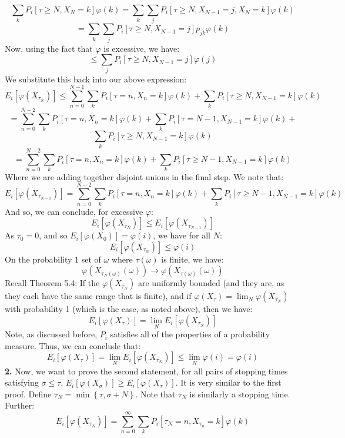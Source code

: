 \documentclass[12pt,a4paper]{article}
\newcommand{\1}[1]{\mathbbm{1}\left\{ #1 \right\}}
\begin{document}
$$
	\sum_k P_i\left[\tau \geq N, X_N = k\right]\varphi(k) =
	\sum_k \sum_j P_i\left[\tau \geq N, X_{N-1} = j, X_N = k\right]\varphi(k)
$$
$$
	= \sum_k \sum_j P_i\left[\tau \geq N, X_{N-1} = j\right]p_{jk}\varphi(k)
$$
Now, using the fact that $\varphi$ is excessive, we have:
$$
	\leq \sum_j P_i\left[\tau \geq N, X_{N-1} = j\right]\varphi(j)
$$
We substitute this back into our above expression:
$$
	E_i\left[\varphi(X_{\tau_N})\right] \leq
	\sum_{n=0}^{N-1} \sum_k P_i\left[\tau = n, X_n = k\right]\varphi(k) +
	\sum_k P_i\left[\tau \geq N, X_{N-1} = k\right]\varphi(k)
$$
$$
	=
	\sum_{n=0}^{N-2} \sum_k P_i\left[\tau = n, X_n = k\right]\varphi(k) +
	\sum_k P_i\left[\tau = N-1, X_{N-1} = k\right]\varphi(k) +
$$
$$
	\sum_k P_i\left[\tau \geq N, X_{N-1} = k\right]\varphi(k)
$$
$$
	=
	\sum_{n=0}^{N-2} \sum_k P_i\left[\tau = n, X_n = k\right]\varphi(k) +
	\sum_k P_i\left[\tau \geq N - 1, X_{N-1} = k\right]\varphi(k)
$$
Where we are adding together disjoint unions in the final step. We note that:
$$
	E_i\left[\varphi(X_{\tau_{N-1}})\right] =
	\sum_{n=0}^{N-2} \sum_k P_i\left[\tau = n, X_n = k\right]\varphi(k) +
	\sum_k P_i\left[\tau \geq N - 1, X_{N-1} = k\right]\varphi(k)
$$
And so, we can conclude, for excessive $\varphi$:
$$
	E_i\left[\varphi(X_{\tau_N})\right] \leq
	E_i\left[\varphi(X_{\tau_{N-1}})\right]
$$
As $\tau_0 = 0$, and so $E_i\left[\varphi(X_0)\right] = \varphi(i)$, we have for all $N$:
$$
	E_i\left[\varphi(X_{\tau_N})\right] \leq \varphi(i)
$$
On the probability 1 set of $\omega$ where $\tau(\omega)$ is finite, we have:
$$
	\varphi(X_{\tau_N(\omega)}(\omega)) \to \varphi(X_{\tau(\omega)}(\omega))
$$
Recall Theorem 5.4: If the $\varphi(X_{\tau_N})$ are uniformly bounded (and they are, as they each have the same range that is finite), and if $\varphi(X_\tau) = \lim_N \varphi(X_{\tau_N})$ with probability 1 (which is the case, as noted above), then we have:
$$
	E_i\left[\varphi(X_\tau)\right] = \lim_N E_i\left[\varphi(X_{\tau_N})\right]
$$
Note, as discussed before, $P_i$ satisfies all of the properties of a probability measure. Thus, we can conclude that:
$$
	E_i\left[\varphi(X_\tau)\right] = \lim_N E_i\left[\varphi(X_{\tau_N})\right] \leq
	\lim_N \varphi(i) = \varphi(i)
$$
\textbf{2.} Now, we want to prove the second statement, for all pairs of stopping times satisfying $\sigma \leq \tau$, $E_i\left[\varphi(X_\sigma)\right] \geq E_i\left[\varphi(X_\tau)\right]$. It is very similar to the first proof. Define $\tau_N = \min\left\{\tau, \sigma + N\right\}$. Note that $\tau_N$ is similarly a stopping time. Further:
$$
	E_i\left[\varphi(X_{\tau_N})\right] = \sum_{n=0}^{\infty} \sum_k P_i\left[\tau_N = n, X_{\tau_n} = k\right]\varphi(k)
$$
\end{document}

